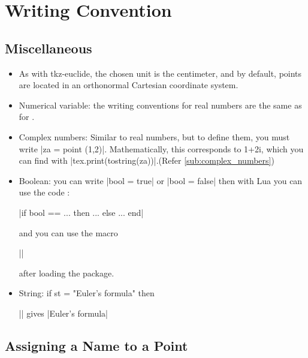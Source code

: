 \newpage

\section{Writing Convention} %
\label{sec:writing_convention}

\subsection{Miscellaneous} %
\label{sub:miscellanous}

\begin{itemize}
  \item As with tkz-euclide, the chosen unit is the centimeter, and by default, points are located in an orthonormal Cartesian coordinate system.
  
   \item Numerical variable: the writing conventions for real numbers are the same as for .
   \item Complex numbers: Similar to real numbers, but to define them, you must write |za = point (1,2)|. Mathematically, this corresponds to 1+2i, which you can find with |tex.print(tostring(za))|.(Refer \ref{sub:complex_numbers})
   \item Boolean: you can write |bool = true| or |bool = false| then with Lua you can use the code :\\
 \begin{mybox}
|if bool == ... then ... else ... end|
\end{mybox}
 
 and  you can use the macro 
\begin{mybox}
 ||
\end{mybox}

     after loading the  package.
   
   \item String: if st = "Euler's formula" then \begin{mybox}
      || gives |Euler's formula|
   \end{mybox}
   

\end{itemize}

\subsection{Assigning a Name to a Point} %
\label{sub:assigning_a_name_to_a_point}

